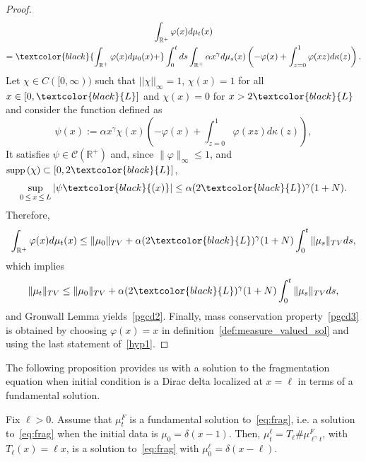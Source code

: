 \documentclass[AHL,Unicode,longabstracts,published]{cedram}
\newcommand*\dst{\displaystyle}
\newcommand*\R{\mathbb{R}}
\newcommand{\clC}{\mathcal{C}}
\newcommand{\MT}[1]{\textcolor{black}{#1}}
\newcommand*\supp{{\mbox{\small\rm supp}}\,}
\begin{document}
\begin{proof}
\begin{multline*}
\int_{\R^+} \varphi(x) d\mu_t(x)\\
=\MT{\int_{\R^+} \varphi(x) d\mu_0(x)+}\dst\int_0^t ds \dst\int_{\R^+} \alpha x^{\gamma} d\mu_s(x) \left(- \varphi(x) + \dst\int_{z=0}^{1} \varphi(xz)d\kappa(z)\right).
\end{multline*}
Let $\chi\in C([0, \infty))$ such that $||\chi||_\infty=1$, $\chi(x)=1$ for all $x\in [0, \MT{L}]$ and $\chi(x)=0$ for $x>2\MT{L}$ and consider the function defined as
\begin{equation*}
\psi(x) := \alpha x^{\gamma}\chi(x) \left(- \varphi(x) + \dst\int_{z=0}^{1} \varphi(xz)d\kappa(z)\right),
\end{equation*}
It satisfies $ \psi \in \clC(\R^+)$ and, since $\|\varphi\|_{\infty} \leq 1$, and $\supp(\chi)\subset [0, 2 \MT{L}]$,
\begin{equation*}
\sup_{0\,\le\,x\,\le\,L} |\psi\MT{(x)}|\leq \alpha (2 \MT{L})^{\gamma} (1+N).
\end{equation*}
Therefore,
\begin{equation*}
\int_{\R^+} \varphi(x) d\mu_t(x)\leq \|\mu_0\|_{TV}+ \alpha (2\MT{L})^{\gamma} (1+N) \dst\int_0^t \|\mu_s\|_{TV} ds,
\end{equation*}
which implies
\begin{equation*}
\|\mu_t\|_{TV}\leq \|\mu_0\|_{TV}+ \alpha (2\MT{L})^{\gamma} (1+N) \dst\int_0^t \|\mu_s\|_{TV} ds,
\end{equation*}
and Gronwall Lemma yields~\eqref{pgcd2}. Finally, mass conservation property~\eqref{pgcd3} is obtained by choosing $\varphi(x)=x$ in definition~\ref{def:measure_valued_sol}
and using the last statement of~\eqref{hyp1}.
\end{proof}

The following proposition provides us with a solution to the fragmentation equation when initial condition is a Dirac delta localized at $x=\ell$ in terms of a fundamental solution.

\begin{prop}\label{prop:rescaling}
Fix $\ell>0$.
Assume that $\mu_t^{F}$ is a fundamental solution to~\eqref{eq:frag}, i.e. a solution to~\eqref{eq:frag} when the initial data is $\mu_0=\delta(x-1)$. Then, $\mu_t^{\ell} = T_{\ell} \# \mu_{\ell^{\gamma}t}^{F}$, with $T_{\ell}(x)= \ell x$, is a solution to~\eqref{eq:frag} with $\mu_0^{\ell}=\delta(x-\ell)$.
\end{prop}
\end{document}

